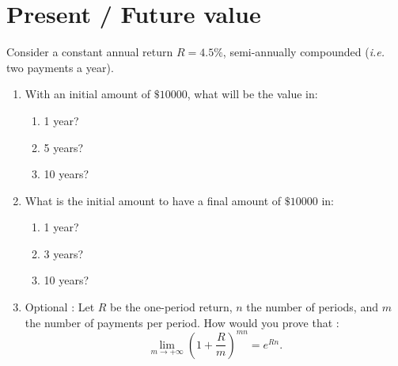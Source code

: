 \section{Present / Future value}
Consider a constant annual return $R = 4.5\%$, semi-annually compounded (\textit{i.e.} two payments a year). 
\begin{enumerate}
    \item With an initial amount of $\$10000 $, what will be the value in:
    \begin{enumerate}
        \item 1 year?
        \item 5 years?
        \item 10 years?
    \end{enumerate}
    \item What is the initial amount to have a final amount of $\$10000$ in:
    \begin{enumerate}
        \item 1 year?
        \item 3 years?
        \item 10 years?
    \end{enumerate}
    \item Optional : Let $R$ be the one-period return, $n$ the number of periods, and $m$ the number of payments per period. How would you prove that : \[ \lim_{m\to+\infty} (1 + \frac{R}{m})^{mn} = e^{Rn} .\]
\end{enumerate}